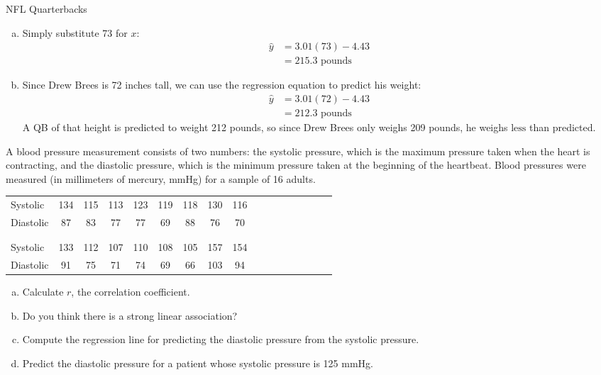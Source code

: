 \begin{example}{NFL Quarterbacks}
\begin{enumerate}[(a)]
\item Simply substitute 73 for $x$:
\begin{align*}
\hat{y} &= 3.01(73) - 4.43\\
&= \boxed{215.3 \textrm{ pounds}}
\end{align*}

\item Since Drew Brees is 72 inches tall, we can use the regression equation to predict his weight:
\begin{align*}
\hat{y} &= 3.01(72) - 4.43\\
&= 212.3 \textrm{ pounds}
\end{align*}
A QB of that height is predicted to weight 212 pounds, so since Drew Brees only weighs 209 pounds, he weighs $\boxed{\textrm{less}}$ than predicted.
\end{enumerate}
\end{example}

\begin{try}
A blood pressure measurement consists of two numbers: the systolic pressure, which is the maximum pressure taken when the heart is contracting, and the diastolic pressure, which is the minimum pressure taken at the beginning of the heartbeat.  Blood pressures were measured (in millimeters of mercury, mmHg) for a sample of 16 adults.
\begin{center}
\begin{tabular}{l | c c c c c c c c c c c c c c c c}
Systolic & 134 & 115 & 113 & 123 & 119 & 118 & 130 & 116\\
Diastolic & 87 & 83 & 77 & 77 & 69 & 88 & 76 & 70\\
\\
\hline
\\
Systolic & 133 & 112 & 107 & 110 & 108 & 105 & 157 & 154\\
Diastolic & 91 & 75 & 71 & 74 & 69 & 66 & 103 & 94
\end{tabular}
\end{center}

\begin{enumerate}[(a)]
\item Calculate $r$, the correlation coefficient.
\item Do you think there is a strong linear association?
\item Compute the regression line for predicting the diastolic pressure from the systolic pressure.
\item Predict the diastolic pressure for a patient whose systolic pressure is 125 mmHg.
\end{enumerate}
\end{try}

